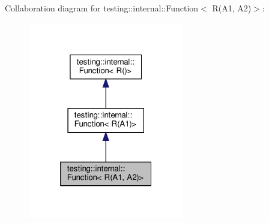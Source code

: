 Collaboration diagram for testing\+:\+:internal\+:\+:Function$<$ R(A1, A2)$>$\+:
\nopagebreak
\begin{figure}[H]
\begin{center}
\leavevmode
\includegraphics[width=193pt]{structtesting_1_1internal_1_1_function_3_01_r_07_a1_00_01_a2_08_4__coll__graph}
\end{center}
\end{figure}
